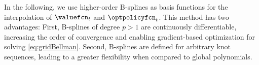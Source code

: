 \vspace*{1em}

In the following, we use higher-order B-splines as basis functions for
the interpolation of $\valuefcn_t$ and $\optpolicyfcn_t$.
This method has two advantages:
First, B-splines of degree $p > 1$ are continuously differentiable,
increasing the order of convergence and enabling
gradient-based optimization for solving \eqref{eq:gridBellman}.
Second, B-splines are defined for arbitrary knot sequences,
leading to a greater flexibility when compared to global polynomials.
